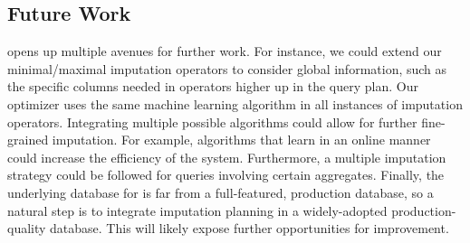 \subsection{Future Work}
\ProjectName{} opens up multiple avenues for further work. For instance, we
could extend our minimal/maximal imputation operators to consider global
information, such as the specific columns needed in operators higher up in the
query plan.  Our optimizer uses the same machine learning algorithm in all
instances of imputation operators. Integrating multiple possible algorithms
could allow for further fine-grained imputation. For example, algorithms that
learn in an online manner could increase the efficiency of the system.
Furthermore, a multiple imputation strategy could be followed for queries
involving certain aggregates. Finally, the underlying database for
\ProjectName{} is far from a full-featured, production database, so a natural
step is to integrate imputation planning in a widely-adopted production-quality
database. This will likely expose further opportunities for improvement.  






